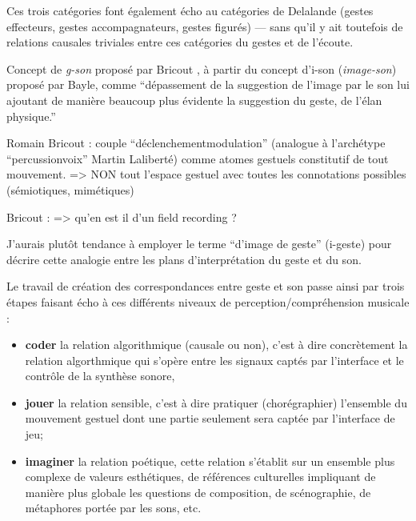 Ces trois catégories font également écho au catégories de Delalande (gestes effecteurs, gestes accompagnateurs, gestes figurés) — sans qu'il y ait toutefois de relations causales triviales entre ces catégories du gestes et de l'écoute.

Concept de \textit{g-son} proposé par Bricout \cite{bricout_les_2011}, à partir du concept d'i-son (\textit{image-son}) proposé par Bayle, comme ``dépassement de la suggestion de l'image par le son lui ajoutant de manière beaucoup plus évidente la suggestion du geste, de l'élan physique.''

Romain Bricout : couple ``déclenchement\/modulation'' (analogue à l'archétype ``percussion\/voix'' Martin Laliberté) comme atomes gestuels constitutif de tout mouvement. => NON tout l'espace gestuel avec toutes les connotations possibles (sémiotiques, mimétiques)

Bricout :
=> qu'en est il d'un field recording ?

J'aurais plutôt tendance à employer le terme ``d'image de geste'' (i-geste) pour décrire cette analogie entre les plans d'interprétation du geste et du son.

Le travail de création des correspondances entre geste et son passe ainsi par trois étapes faisant écho à ces différents niveaux de perception/compréhension musicale :
\vspace{-1em}
\begin{itemize}[noitemsep]
\item \textbf{coder} la relation algorithmique (causale ou non), c'est à dire concrètement la relation algorthmique qui s'opère entre les signaux captés par l'interface et le contrôle de la synthèse sonore, 
\item\textbf{jouer} la relation sensible, c'est à dire pratiquer (chorégraphier) l'ensemble du mouvement gestuel dont une partie seulement sera captée par l'interface de jeu;
\item\textbf{imaginer} la relation poétique, cette relation s'établit sur un ensemble plus complexe de valeurs esthétiques, de références culturelles impliquant de manière plus globale les questions de composition, de scénographie, de métaphores portée par les sons, etc.
\end{itemize}




